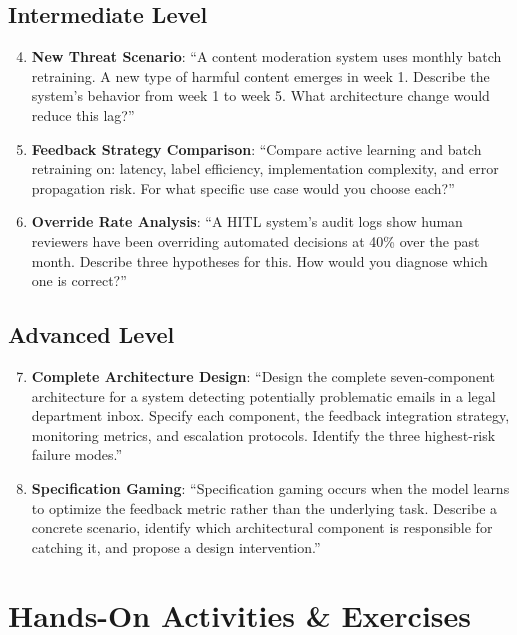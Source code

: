 \subsection{Intermediate Level}

\begin{enumerate}
    \setcounter{enumi}{3}
    \item \textbf{New Threat Scenario}: ``A content moderation system uses monthly batch retraining. A new type of harmful content emerges in week 1. Describe the system's behavior from week 1 to week 5. What architecture change would reduce this lag?''

    \item \textbf{Feedback Strategy Comparison}: ``Compare active learning and batch retraining on: latency, label efficiency, implementation complexity, and error propagation risk. For what specific use case would you choose each?''

    \item \textbf{Override Rate Analysis}: ``A HITL system's audit logs show human reviewers have been overriding automated decisions at 40\% over the past month. Describe three hypotheses for this. How would you diagnose which one is correct?''
\end{enumerate}

\subsection{Advanced Level}

\begin{enumerate}
    \setcounter{enumi}{6}
    \item \textbf{Complete Architecture Design}: ``Design the complete seven-component architecture for a system detecting potentially problematic emails in a legal department inbox. Specify each component, the feedback integration strategy, monitoring metrics, and escalation protocols. Identify the three highest-risk failure modes.''

    \item \textbf{Specification Gaming}: ``Specification gaming occurs when the model learns to optimize the feedback metric rather than the underlying task. Describe a concrete scenario, identify which architectural component is responsible for catching it, and propose a design intervention.''
\end{enumerate}

\section{Hands-On Activities \& Exercises}

